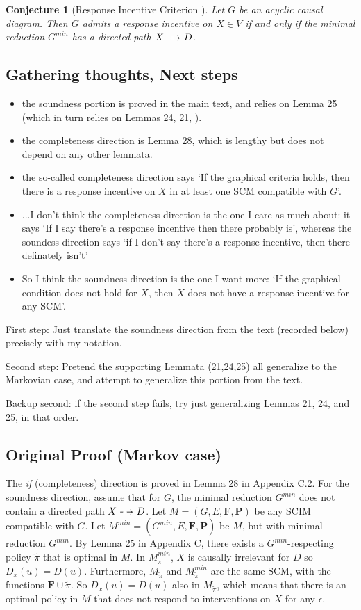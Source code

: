 \documentclass[letterpaper,10pt]{article}
\newtheorem{conjecture}{Conjecture}
\newcommand\dashto{\mathrel{
  -\mkern-6mu{\to}\mkern-20mu{\color{white}\bullet}\mkern12mu
}}
\begin{document}
\begin{conjecture}[Response Incentive Criterion \cite{everitt2021agent}]\label{nonmarkov}
Let $G$ be an acyclic causal diagram. Then $G$ admits a response incentive on $X\in V$ if and only if the minimal reduction $G^{min}$ has a directed path $X\dashto D$.
\end{conjecture}

\subsection{Gathering thoughts, Next steps}
\begin{itemize}
  \item the soundness portion is proved in the main text, and relies on Lemma 25 (which in turn relies on Lemmas 24, 21, ).
  \item the completeness direction is Lemma 28, which is lengthy but does not depend on any other lemmata.
  \item the so-called completeness direction says `If the graphical criteria holds, then there is a response incentive on $X$ in at least one SCM compatible with $G$'.
  \item ...I don't think the completeness direction is the one I care as much about: it says `If I say there's a response incentive then there probably is', whereas the soundess direction says `if I don't say there's a response incentive, then there definately isn't'
  \item So I think the soundness direction is the one I want more: `If the graphical condition does not hold for $X$, then $X$ does not have a response incentive for any SCM'.
\end{itemize}
First step: Just translate the soundness direction from the text (recorded below) precisely with my notation.

Second step: Pretend the supporting Lemmata (21,24,25) all generalize to the Markovian case, and attempt to generalize this portion from the text.

Backup second: if the second step fails, try just generalizing Lemmas 21, 24, and 25, in that order.

\subsection{Original Proof (Markov case)}

The \emph{if} (completeness) direction is proved in  Lemma 28 in Appendix C.2. For the soundness direction, assume that for $G$, the minimal reduction $G^{min}$ does not contain a directed path $X\dashto D$. Let $M=(G,E,\mathbf{F},\mathbf{P})$ be any SCIM compatible with $G$. Let $M^{min}=(G^{min},E,\mathbf{F},\mathbf{P})$ be $M$, but with minimal reduction $G^{min}$. By Lemma 25 in Appendix C, there exists a $G^{min}$-respecting policy $\tilde{\pi}$ that is optimal in $M$. In $M^{min}_{\tilde{\pi}}$, $X$ is causally irrelevant for $D$ so $D_x(u) = D(u)$. Furthermore, $M_{\tilde{\pi}}$ and $M^{min}_{\tilde{\pi}}$ are the same SCM, with the functions $\mathbf{F}\cup{\tilde{\pi}}$. So $D_x(u) = D(u)$ also in $M_{\tilde{\pi}}$, which means that there is an optimal policy in $M$ that does not respond to interventions on $X$ for any $\epsilon$.
\end{document}

